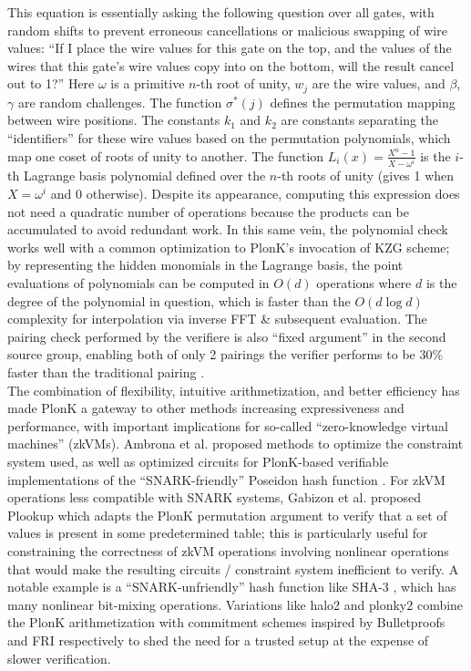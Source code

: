 \noindent This equation is essentially asking the following question over all gates, with random shifts to prevent erroneous cancellations or malicious swapping of wire values: ``If I place the wire values for this gate on the top, and the values of the wires that this gate's wire values copy into on the bottom, will the result cancel out to 1?'' Here $\omega$ is a primitive $n$-th root of unity, $w_j$ are the wire values, and $\beta$, $\gamma$ are random challenges. The function $\sigma^*(j)$ defines the permutation mapping between wire positions. The constants $k_1$ and $k_2$ are constants separating the ``identifiers'' for these wire values based on the permutation polynomials, which map one coset of roots of unity to another. The function $L_i(x) = \frac{X^n - 1}{X - \omega^i}$ is the $i$-th Lagrange basis polynomial defined over the $n$-th roots of unity (gives 1 when $X = \omega^i$ and 0 otherwise). Despite its appearance, computing this expression does not need a quadratic number of operations because the products can be accumulated to avoid redundant work. In this same vein, the polynomial check works well with a common optimization to PlonK's invocation of KZG scheme; by representing the hidden monomials in the Lagrange basis, the point evaluations of polynomials can be computed in $O(d)$ operations where $d$ is the degree of the polynomial in question, which is faster than the $O(d \log d)$ complexity for interpolation via inverse FFT \& subsequent evaluation. The pairing check performed by the verifiere is also ``fixed argument'' in the second source group, enabling both of only 2 pairings the verifier performs to be 30\% faster than the traditional pairing \cite{fapairings}.\\

\noindent The combination of flexibility, intuitive arithmetization, and better efficiency has made PlonK a gateway to other methods increasing expressiveness and performance, with important implications for so-called ``zero-knowledge virtual machines'' (zkVMs). Ambrona et al. \cite{turboplonk} proposed methods to optimize the constraint system used, as well as optimized circuits for PlonK-based verifiable implementations of the ``SNARK-friendly'' Poseidon hash function \cite{poseidon}. For zkVM operations less compatible with SNARK systems, Gabizon et al. proposed Plookup \cite{plookup} which adapts the PlonK permutation argument to verify that a set of values is present in some predetermined table; this is particularly useful for constraining the correctness of zkVM operations involving nonlinear operations that would make the resulting circuits / constraint system inefficient to verify. A notable example is a ``SNARK-unfriendly'' hash function like SHA-3 \cite{sha3}, which has many nonlinear bit-mixing operations. Variations like halo2 \cite{halo2} and plonky2 \cite{plonky2} combine the PlonK arithmetization with commitment schemes inspired by Bulletproofs \cite{bulletproofs} and FRI \cite{fri} respectively to shed the need for a trusted setup at the expense of slower verification. \\

